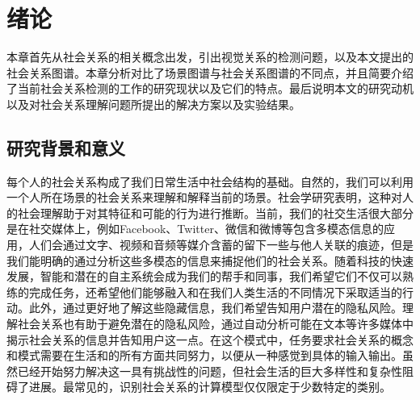 

\chapter{绪论}
\label{ch:intro}

本章首先从社会关系的相关概念出发，引出视觉关系的检测问题，以及本文提出的社会关系图谱。本章分析对比了场景图谱与社会关系图谱的不同点，并且简要介绍了当前社会关系检测的工作的研究现状以及它们的特点。最后说明本文的研究动机以及对社会关系理解问题所提出的解决方案以及实验结果。
\section{研究背景和意义}

每个人的社会关系构成了我们日常生活中社会结构的基础。自然的，我们可以利用一个人所在场景的社会关系来理解和解释当前的场景。社会学研究表明，这种对人的社会理解助于对其特征和可能的行为进行推断。当前，我们的社交生活很大部分是在社交媒体上，例如Facebook、Twitter、微信和微博等包含多模态信息的应用，人们会通过文字、视频和音频等媒介含蓄的留下一些与他人关联的痕迹，但是我们能明确的通过分析这些多模态的信息来捕捉他们的社会关系。随着科技的快速发展，智能和潜在的自主系统会成为我们的帮手和同事，我们希望它们不仅可以熟练的完成任务，还希望他们能够融入和在我们人类生活的不同情况下采取适当的行动。此外，通过更好地了解这些隐藏信息，我们希望告知用户潜在的隐私风险。理解社会关系也有助于避免潜在的隐私风险，通过自动分析可能在文本等许多媒体中揭示社会关系的信息并告知用户这一点。在这个模式中，任务要求社会关系的概念和模式需要在生活和的所有方面共同努力，以便从一种感觉到具体的输入输出。虽然已经开始努力解决这一具有挑战性的问题，但社会生活的巨大多样性和复杂性阻碍了进展。最常见的，识别社会关系的计算模型仅仅限定于少数特定的类别。

